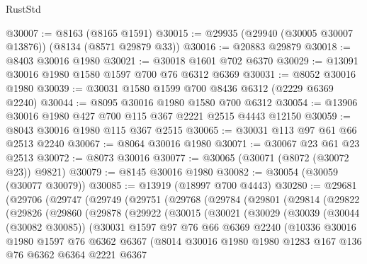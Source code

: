 \begin{lexlean}{RustStd}
\begin{coremodule}
{\begin{coremodule}
{{{{{{{{{{{{{{{{{{{{{{{{{{{{{{{{{{{{{{{{{{{{{{{{{{{{{@30007 := @8163 (@8165 @1591)
@30015 := @29935 (@29940 (@30005 @30007 @13876)) (@8134 (@8571 @29879 @33))
@30016 := @20883 @29879
@30018 := @8403 @30016 @1980
@30021 := @30018 @1601 @702 @6370
@30029 := @13091 @30016 @1980 @1580 @1597 @700 @76 @6312 @6369
@30031 := @8052 @30016 @1980
@30039 := @30031 @1580 @1599 @700 @8436 @6312 (@2229 @6369 @2240)
@30044 := @8095 @30016 @1980 @1580 @700 @6312
@30054 := @13906 @30016 @1980 @427 @700 @115 @367 @2221 @2515 @4443 @12150
@30059 := @8043 @30016 @1980 @115 @367 @2515
@30065 := @30031 @113 @97 @61 @66 @2513 @2240
@30067 := @8064 @30016 @1980
@30071 := @30067 @23 @61 @23 @2513
@30072 := @8073 @30016
@30077 := @30065 (@30071 (@8072 (@30072 @23)) @9821)
@30079 := @8145 @30016 @1980
@30082 := @30054 (@30059 (@30077 @30079))
@30085 := @13919 (@18997 @700 @4443)
@30280 := @29681
    (@29706
      (@29747
        (@29749
          (@29751
            (@29768
              (@29784
                (@29801
                  (@29814
                    (@29822
                      (@29826
                        (@29860
                          (@29878
                            (@29922
                              (@30015
                                (@30021
                                  (@30029
                                    (@30039
                                      (@30044 (@30082 @30085))
                                      (@30031
                                        @1597
                                        @97
                                        @76
                                        @66
                                        @6369
                                        @2240
                                        (@10336
                                          @30016
                                          @1980
                                          @1597
                                          @76
                                          @6362
                                          @6367
                                          (@8014
                                            @30016
                                            @1980
                                            @1980
                                            @1283
                                            @167
                                            @136
                                            @76
                                            @6362
                                            @6364
                                            @2221
                                            @6367
}}}}}}}}}}}}}}}}}}}}}}}}}}}}}}}}}}}}}}}}}}}}}}}}}}}}}
\end{coremodule}}
\end{coremodule}
\end{lexlean}
